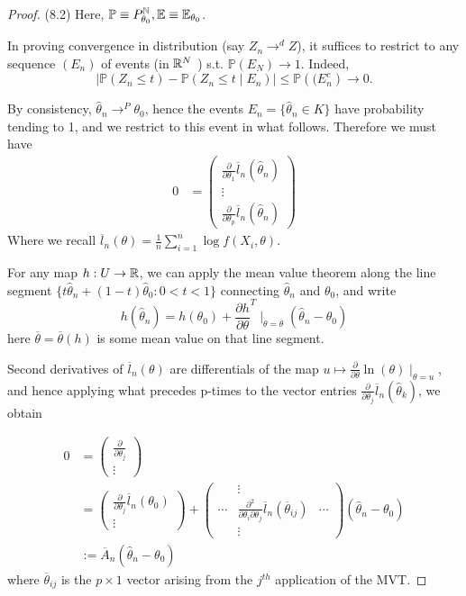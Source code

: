 \documentclass[a4paper]{article}
\begin{document}
\begin{proof}(8.2)
        Here, $\mathbb{P} \equiv P_{\theta_0}^{\mathbb{N}}, \mathbb{E} \equiv \mathbb{E}_{\theta_0}$.

	In proving convergence in distribution (say $Z_n \to ^{d} Z$), it suffices to restrict to any sequence $(E_n)$ of events (in $\mathbb{R}^{N}$ ) s.t. $\mathbb{P}\left( E_N \right) \to  1$. Indeed,
	\[
		|\mathbb{P}\left( Z_n \le  t \right) - \mathbb{P}\left( Z_n \le t  \mid  E_n \right) | \le \mathbb{P}\left( (E_n^{c} \right) \to 0
	.\]

	By consistency, $\hat{\theta}_n \to ^{P} \theta_0$, hence the events $E_n = \{\hat{\theta}_n \in K\} $ have probability tending to 1, and we restrict to this event in what follows. Therefore we must have
	\begin{align*}
		0 &= \begin{pmatrix} \frac{\partial}{\partial\theta_1} \overline{l}_n (\hat{\theta}_n) \\ \vdots \\ \frac{\partial}{\partial\theta_p} \overline{l}_n (\hat{\theta}_n) \end{pmatrix} 
	\end{align*} 
	Where we recall $\overline{l}_n(\theta) = \frac{1}{n} \sum_{i=1}^{n} \log f(X_i, \theta)$.

	For any map $h: U \to \mathbb{R}$, we can apply the mean value theorem along the line segment $\{t \hat{\theta}_n + (1-t) \hat{\theta}_0 : 0 < t < 1\} $ connecting $\hat{\theta}_n $ and $\theta_0$, and write
	\[
		h(\hat{\theta}_n) = h(\theta_0) + \frac{\partial h}{\partial \theta}^{T} \mid_{\theta = \overline{\theta}} (\hat{\theta}_n - \theta_0) 
	\]
	here $\overline{\theta} = \overline{\theta}(h)$ is some mean value on that line segment.

	Second derivatives of $\overline{l}_n(\theta)$ are differentials of the map $u \mapsto \frac{\partial}{\partial\theta} \ln(\theta)  \mid _{\theta = u}$, and hence applying what precedes p-times to the vector entries $\frac{\partial}{\partial\theta_j} \overline{l}_n(\hat{\theta}_k)$, we obtain

	\begin{align*}
		0 &= \begin{pmatrix} \frac{\partial}{\partial\theta_j} \\ \vdots \end{pmatrix} \\
		&= \begin{pmatrix} \frac{\partial}{\partial\theta_j} \overline{l}_n(\theta_0) \\ \vdots \end{pmatrix} + \begin{pmatrix} & \vdots & \\ \cdots & \frac{\partial^2}{\partial\theta_i \partial\theta_j} \overline{l}_n(\overline{\theta}_{ij}) & \cdots \\ & \vdots &\end{pmatrix} (\hat{\theta}_n - \theta_0) \\
		&:= \overline{A}_n (\hat{\theta}_n - \theta_0)
	\end{align*}
	where $\overline{\theta}_{ij}$ is the $p\times 1$ vector arising from the $j^{th}$ application of the MVT.


\end{proof}
\end{document}
